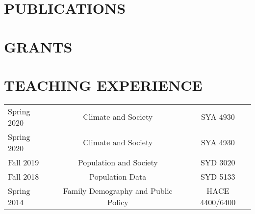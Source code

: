 \documentclass[letterpaper,11pt]{article}
\begin{document}

\section{PUBLICATIONS}



\section{GRANTS}


\section{TEACHING EXPERIENCE}
\begin{tabularx}{\linewidth}{l c c}
\hline
Spring 2020 & Climate and Society & SYA 4930 \\
Spring 2020 & Climate and Society & SYA 4930 \\
Fall 2019 & Population and Society & SYD 3020\\
Fall 2018 & Population Data & SYD 5133\\
Spring 2014 & Family Demography and Public Policy & HACE 4400/6400\\
\hline
\end{tabularx}
\end{document}
